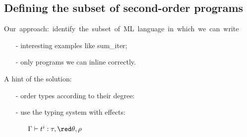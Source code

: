\subsection*{Defining the subset of second-order programs}
\begin{frame}[fragile]
\hspace*{-2em} \mbox{{\blue Our approach}: identify the subset of ML language in which we can write}\vspace*{-0.5em}
\begin{itemize}
\item[-] interesting examples like sum\_iter;
\item[-] only programs we can inline correctly.\\[1em]
\end{itemize}\pause

{\hspace*{-2em} \blue A hint of the solution}: 
\begin{itemize}
	\item[-] {\red order} types according to their degree:\\[0.5em]
		\begin{itemize}	
		\end{itemize}
		 \pause
	\item[-] use the typing system {\red with effects}:\\[0.5em]
		\begin{itemize}
			\item[] \qquad $\Gamma \vdash t^{i}: \tau, {\red \theta, \rho} $
		\end{itemize}
\end{itemize}
\end{frame}


